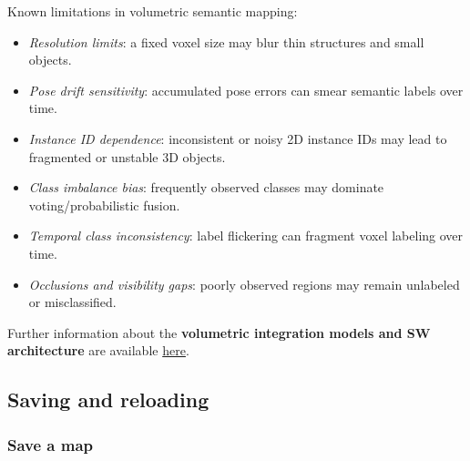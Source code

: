 \documentclass{article}
\begin{document}
Known limitations in volumetric semantic mapping:
\begin{itemize}
\item \textit{Resolution limits}: a fixed voxel size may blur thin structures and small objects.
\item \textit{Pose drift sensitivity}: accumulated pose errors can smear semantic labels over time.
\item \textit{Instance ID dependence}: inconsistent or noisy 2D instance IDs may lead to fragmented or unstable 3D objects.
\item \textit{Class imbalance bias}: frequently observed classes may dominate voting/probabilistic fusion.
\item \textit{Temporal class inconsistency}: label flickering can fragment voxel labeling over time.
\item \textit{Occlusions and visibility gaps}: poorly observed regions may remain unlabeled or misclassified.
\end{itemize}

Further information about the \textbf{volumetric integration models and
SW architecture} are available \href{https://github.com/luigifreda/pyslam/blob/master/cpp/modules/volumetric/README.md}{here}.


\hypertarget{saving-and-reloading}{%
\subsection{Saving and reloading}\label{saving-and-reloading}}

\hypertarget{save-the-a-map}{%
\subsubsection{Save a map}\label{save-the-a-map}}
\end{document}
